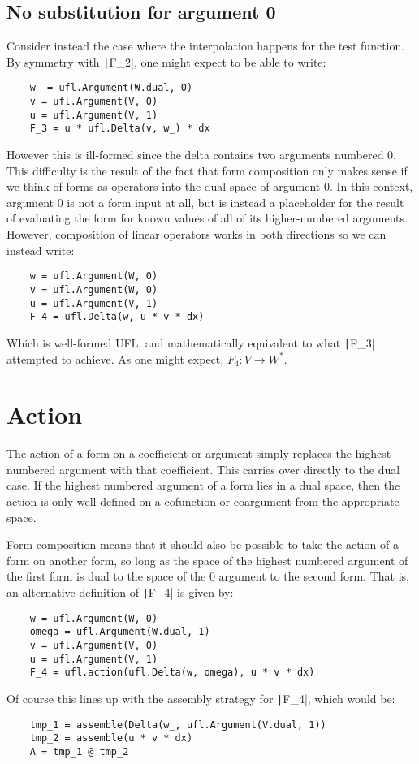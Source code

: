 \documentclass[a4paper,11pt]{article}
\begin{document}
\subsection{No substitution for argument 0}
Consider instead the case where the interpolation happens for the test function. By symmetry with \texttt|F_2|, one might expect to be able to write:
\begin{verbatim}
    w_ = ufl.Argument(W.dual, 0)
    v = ufl.Argument(V, 0)
    u = ufl.Argument(V, 1)
    F_3 = u * ufl.Delta(v, w_) * dx
\end{verbatim}
However this is ill-formed since the delta contains two arguments numbered 0. This difficulty is the result of the fact that form composition only makes sense if we think of forms as operators into the dual space of argument 0. In this context, argument 0 is not a form input at all, but is instead a placeholder for the result of evaluating the form for known values of all of its higher-numbered arguments. However, composition of linear operators works in both directions so we can instead write:
\begin{verbatim}
    w = ufl.Argument(W, 0)
    v = ufl.Argument(W, 0)
    u = ufl.Argument(V, 1)
    F_4 = ufl.Delta(w, u * v * dx)
\end{verbatim}
Which is well-formed UFL, and mathematically equivalent to what \texttt|F_3| attempted to achieve. As one might expect, $F_4: V \rightarrow W^*$.

\section{Action}

The action of a form on a coefficient or argument simply replaces the highest numbered argument with that coefficient. This carries over directly to the dual case. If the highest numbered argument of a form lies in a dual space, then the action is only well defined on a cofunction or coargument from the appropriate space.

Form composition means that it should also be possible to take the action of a form on another form, so long as the space of the highest numbered argument of the first form is dual to the space of the 0 argument to the second form. That is, an alternative definition of \texttt|F_4| is given by:
\begin{verbatim}
    w = ufl.Argument(W, 0)
    omega = ufl.Argument(W.dual, 1)
    v = ufl.Argument(V, 0)
    u = ufl.Argument(V, 1)
    F_4 = ufl.action(ufl.Delta(w, omega), u * v * dx)
\end{verbatim}
Of course this lines up with the assembly strategy for \texttt|F_4|, which would be:
\begin{verbatim}
    tmp_1 = assemble(Delta(w_, ufl.Argument(V.dual, 1))
    tmp_2 = assemble(u * v * dx)
    A = tmp_1 @ tmp_2
\end{verbatim}
\printbibliography
\end{document}
